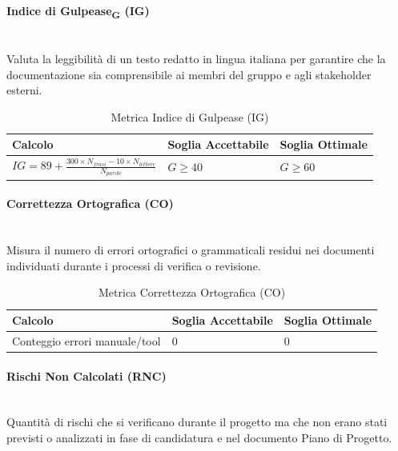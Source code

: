 \documentclass[11pt,a4paper]{article}
\begin{document}
\paragraph{Indice di Gulpease\textsubscript{G} (IG)} \hfill \\
Valuta la leggibilità di un testo redatto in lingua italiana per garantire che la documentazione sia comprensibile ai membri del gruppo e agli stakeholder esterni.

\begin{table}[H]
    \centering
    \renewcommand{\arraystretch}{1.5}
    \begin{tabular}{|M{0.4\textwidth}|M{0.25\textwidth}|M{0.25\textwidth}|}
        \hline
        \textbf{Calcolo} & \textbf{Soglia Accettabile} & \textbf{Soglia Ottimale} \\
        \hline
        $IG = 89 + \frac{300 \times N_{frasi} - 10 \times N_{lettere}}{N_{parole}}$ & $G \ge 40$ & $G \ge 60$ \\
        \hline
    \end{tabular}
    \caption{Metrica Indice di Gulpease (IG)}
\end{table}

\paragraph{Correttezza Ortografica (CO)} \hfill \\
Misura il numero di errori ortografici o grammaticali residui nei documenti individuati durante i processi di verifica o revisione.

\begin{table}[H]
    \centering
    \renewcommand{\arraystretch}{1.5}
    \begin{tabular}{|M{0.4\textwidth}|M{0.25\textwidth}|M{0.25\textwidth}|}
        \hline
        \textbf{Calcolo} & \textbf{Soglia Accettabile} & \textbf{Soglia Ottimale} \\
        \hline
        Conteggio errori manuale/tool & 0 & 0 \\
        \hline
    \end{tabular}
    \caption{Metrica Correttezza Ortografica (CO)}
\end{table}

\paragraph{Rischi Non Calcolati (RNC)} \hfill \\
Quantità di rischi che si verificano durante il progetto ma che non erano stati previsti o analizzati in fase di candidatura e nel documento Piano di Progetto.
\end{document}
